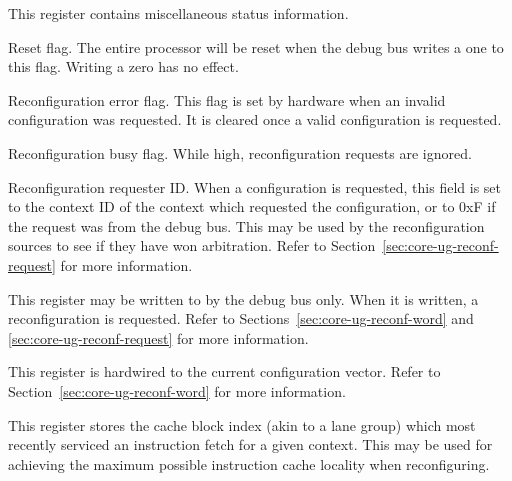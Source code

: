 This register contains miscellaneous status information.

\debugCanWrite{}
Reset flag. The entire \rvex{} processor will be reset when the debug bus writes
a one to this flag. Writing a zero has no effect.

Reconfiguration error flag. This flag is set by hardware when an invalid
configuration was requested. It is cleared once a valid configuration is
requested.

Reconfiguration busy flag. While high, reconfiguration requests are ignored.

Reconfiguration requester ID. When a configuration is requested, this field is
set to the context ID of the context which requested the configuration, or to
0xF if the request was from the debug bus. This may be used by the
reconfiguration sources to see if they have won arbitration. Refer to
Section~\ref{sec:core-ug-reconf-request} for more information.


This register may be written to by the debug bus only. When it is written, a
reconfiguration is requested. Refer to Sections~\ref{sec:core-ug-reconf-word}
and \ref{sec:core-ug-reconf-request} for more information.

\debugCanWrite{}


This register is hardwired to the current configuration vector. Refer to
Section~\ref{sec:core-ug-reconf-word} for more information.



This register stores the cache block index (akin to a lane group) which most
recently serviced an instruction fetch for a given context. This may be used for
achieving the maximum possible instruction cache locality when reconfiguring.

